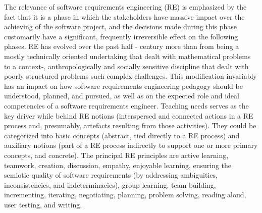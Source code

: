 \documentclass[12pt,a4paper]{article}
\begin{document}
\begin{itemize}
The relevance of software requirements engineering (RE) is emphasized by the fact that it is a phase in which the stakeholders have massive impact over the achieving of the software project, and the decisions made during this phase customarily have a significant, frequently irreversible effect on the following phases. RE has evolved over the past half - century more than from being a mostly technically oriented undertaking that dealt with mathematical problems to a context-, anthropologically and socially sensitive discipline that dealt with poorly structured problems such complex challenges. This modification invariably has an impact on how software requirements engineering pedagogy should be understood, planned, and pursued, as well as on the expected role and ideal competencies of a software requirements engineer. Teaching needs serves as the key driver while behind RE notions (interspersed and connected actions in a RE process and, presumably, artefacts resulting from those activities). They could be categorized into basic concepts (abstract, tied directly to a RE process) and auxiliary notions (part of a RE process indirectly to support one or more primary concepts, and concrete). 
The principal RE principles are active learning, teamwork, creation, discussion, empathy, enjoyable learning, ensuring the semiotic quality of software requirements (by addressing ambiguities, inconsistencies, and indeterminacies), group learning, team building, incrementing, iterating, negotiating, planning, problem solving, reading aloud, user testing, and writing.
\end{itemize}
\end{document}
